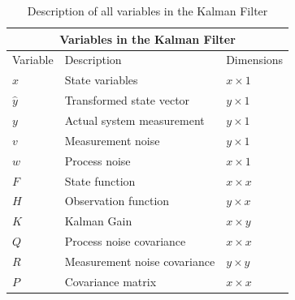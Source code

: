 \begin{center}
\begin{table}
\centering
\caption{Description of all variables in the Kalman Filter} \label{tab:sometab}
\begin{tabular}{ |p{2cm}||p{5cm}|p{2cm}| }
    \hline
    \multicolumn{3}{|c|}{Variables in the Kalman Filter } \\ 
    \hline
    Variable & Description & Dimensions \\
    \hline
    $x$ & State variables  & $x \times 1$ \\
    $\hat y$ & Transformed state vector  & $y \times 1$ \\
    $y$ & Actual system measurement & $y \times 1$ \\
    $v$ & Measurement noise & $y \times 1$\\
    $w$ & Process noise & $x \times 1$\\
    $F$ & State function  & $x \times x $  \\ 
    $H$ & Observation function & $y \times x$\\
    $K$ & Kalman Gain  & $x \times y$\\
    $Q$ & Process noise covariance  & $x \times x$ \\
    $R$ & Measurement noise covariance &  $y \times y$\\
    $P$ & Covariance matrix & $x \times x $  \\ 
    \hline
\end{tabular}
\end{table}
\end{center} 

\newpage




